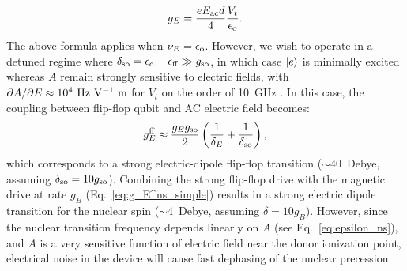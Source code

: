 \documentclass[
 aps,prb,twocolumn,
 amsmath,amssymb,superscriptaddress,
] {revtex4-1}
\begin{document}
\begin{equation} \label{eq:g_E}
g_{E}=\frac{e E_{\rm ac} d}{4}\frac{V_t}{\epsilon_{\rm o}}.
\end{equation}
The above formula applies when $\nu_E = \epsilon_{\rm o}$. However, we wish to operate in a detuned regime where $\delta_{\rm so} = \epsilon_{\rm o} - \epsilon_{\rm ff} \gg g_{\rm so}$, in which case $\ket{e}$ is minimally excited whereas $A$ remain strongly sensitive to electric fields, with $\partial A/\partial E\approx10^4~{\rm Hz~V^{-1}~m}$ for $V_t$ on the order of 10~GHz \cite{Tosi2017}. In this case, the coupling between flip-flop qubit and AC electric field becomes:
\begin{equation}
g_E^{\rm ff}\approx \frac{g_Eg_{\rm so}}{2}\left(\frac{1}{\delta_E}+\frac{1}{\delta_{\rm so}}\right),
\end{equation}
which corresponds to a strong electric-dipole flip-flop transition ($\sim40$~Debye, assuming $\delta_{\rm so}=10g_{\rm so}$). Combining the strong flip-flop drive with the magnetic drive at rate $g_B$ (Eq.~\ref{eq:g_E^ns_simple}) results in a strong electric dipole transition for the nuclear spin ($\sim4$~Debye, assuming $\delta=10g_B$). However, since the nuclear transition frequency depends linearly on $A$ (see Eq.~\ref{eq:epsilon_ns}), and $A$ is a very sensitive function of electric field near the donor ionization point, electrical noise in the device will cause fast dephasing of the nuclear precession.
\end{document}
